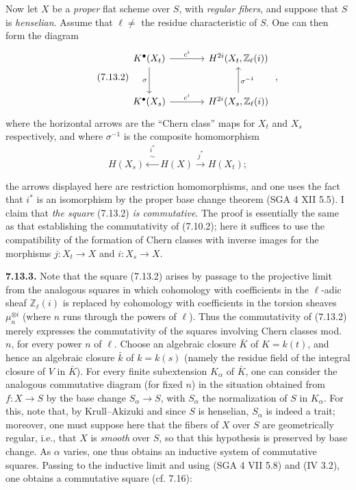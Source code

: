Now let \(X\) be a \emph{proper} flat scheme over \(S\), with \emph{regular fibers}, and suppose that \(S\) is \emph{henselian}. Assume that \(\ell\neq\) the residue characteristic of \(S\). One can then form the diagram
\begin{equation}\tag{7.13.2}
\begin{tikzcd}[column sep=large,row sep=large]
K^\bullet(X_t) \arrow[r,"c^i"] \arrow[d,"\sigma"'] &
H^{2i}(X_t,\mathbb Z_\ell(i))\\
K^\bullet(X_s) \arrow[r,"c^i"] & H^{2i}(X_s,\mathbb Z_\ell(i)) \arrow[u,"\sigma^{-1}"']
\end{tikzcd}
\;,
\end{equation}
where the horizontal arrows are the ``Chern class'' maps for \(X_t\) and \(X_s\) respectively, and where \(\sigma^{-1}\) is the composite homomorphism
\[
  H(X_s)\xleftarrow{\substack{i^*\\\sim}}H(X)\xrightarrow{j^*}H(X_t);
\]

%

the arrows displayed here are restriction homomorphisms, and one uses the fact that \(i^*\) is an isomorphism by the proper base change theorem (SGA 4 XII 5.5). I claim that \emph{the square} (7.13.2) \emph{is commutative}. The proof is essentially the same as that establishing the commutativity of (7.10.2); here it suffices to use the compatibility of the formation of Chern classes with inverse images for the morphisms \(j:X_t\to X\) and \(i:X_s\to X\).

\textbf{7.13.3.} Note that the square (7.13.2) arises by passage to the projective limit from the analogous squares in which cohomology with coefficients in the \(\ell\)-adic sheaf \(\mathbb Z_\ell(i)\) is replaced by cohomology with coefficients in the torsion sheaves \(\mu_n^{\otimes i}\) (where \(n\) runs through the powers of \(\ell\)). Thus the commutativity of (7.13.2) merely expresses the commutativity of the squares involving Chern classes mod. \(n\), for every power \(n\) of \(\ell\). Choose an algebraic closure \(\bar K\) of \(K=k(t)\), and hence an algebraic closure \(\bar k\) of \(k=k(s)\) (namely the residue field of the integral closure of \(V\) in \(\bar K\)). For every finite subextension \(K_\alpha\) of \(\bar K\), one can consider the analogous commutative diagram (for fixed \(n\)) in the situation obtained from \(f:X\to S\) by the base change \(S_\alpha\to S\), with \(S_\alpha\) the normalization of \(S\) in \(K_\alpha\). For this, note that, by Krull--Akizuki and since \(S\) is henselian, \(S_\alpha\) is indeed a trait; moreover, one must suppose here that the fibers of \(X\) over \(S\) are geometrically regular, i.e., that \(X\) is \emph{smooth} over \(S\), so that this hypothesis is preserved by base change. As \(\alpha\) varies, one thus obtains an inductive system of commutative squares. Passing to the inductive limit and using (SGA 4 VII 5.8) and (IV 3.2), one obtains a commutative square (cf. 7.16):

